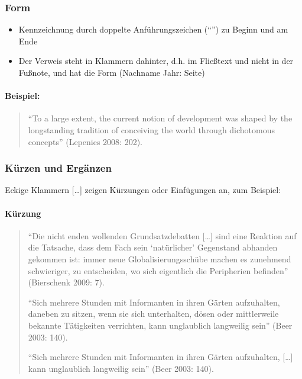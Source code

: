 \documentclass[ 12pt,
                titlepage,
                parskip=half,
                version=first,
                bibliography=totocnumbered,
                final,
                listof=totoc]{scrartcl}
\begin{document}
\subsubsection{Form}

\begin{itemize}
    \item Kennzeichnung durch doppelte Anführungszeichen (\enquote{}) zu Beginn
    und am Ende
    \item Der Verweis steht in Klammern dahinter, d.h. im Fließtext und nicht in
    der Fußnote, und hat die Form (Nachname Jahr: Seite)
\end{itemize}

\paragraph{Beispiel:}
\begin{quote}
\enquote{To a large extent, the current notion of development was shaped by the
longstanding tradition of conceiving the world through dichotomous concepts}
(Lepenies 2008: 202).
\end{quote}

\subsubsection{Kürzen und Ergänzen}

Eckige Klammern [\ldots] zeigen Kürzungen oder Einfügungen an, zum Beispiel:

\paragraph{Kürzung}
\begin{quote}
\enquote{Die nicht enden wollenden Grundsatzdebatten [\ldots] sind eine Reaktion
auf die Tatsache, dass dem Fach sein \enquote{natürlicher} Gegenstand abhanden
gekommen ist: immer neue Globalisierungsschübe machen es zunehmend schwieriger,
zu entscheiden, wo sich eigentlich die Peripherien befinden} (Bierschenk 2009:
7).

\enquote{Sich mehrere Stunden mit Informanten in ihren Gärten aufzuhalten,
daneben zu sitzen, wenn sie sich unterhalten, dösen oder mittlerweile bekannte
Tätigkeiten verrichten, kann unglaublich langweilig sein} (Beer 2003: 140).

\enquote{Sich mehrere Stunden mit Informanten in ihren Gärten aufzuhalten,
[\ldots] kann unglaublich langweilig sein} (Beer 2003: 140).
\end{quote}
\end{document}
